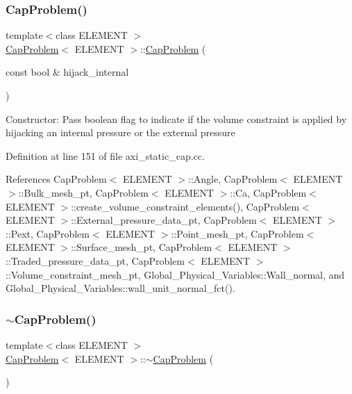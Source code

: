 \subsubsection{\texorpdfstring{Cap\+Problem()}{CapProblem()}}
{\footnotesize\ttfamily template$<$class E\+L\+E\+M\+E\+NT $>$ \\
\hyperlink{classCapProblem}{Cap\+Problem}$<$ E\+L\+E\+M\+E\+NT $>$\+::\hyperlink{classCapProblem}{Cap\+Problem} (\begin{DoxyParamCaption}\item[{const bool \&}]{hijack\+\_\+internal }\end{DoxyParamCaption})}

Constructor\+: Pass boolean flag to indicate if the volume constraint is applied by hijacking an internal pressure or the external pressure 

Definition at line 151 of file axi\+\_\+static\+\_\+cap.\+cc.



References Cap\+Problem$<$ E\+L\+E\+M\+E\+N\+T $>$\+::\+Angle, Cap\+Problem$<$ E\+L\+E\+M\+E\+N\+T $>$\+::\+Bulk\+\_\+mesh\+\_\+pt, Cap\+Problem$<$ E\+L\+E\+M\+E\+N\+T $>$\+::\+Ca, Cap\+Problem$<$ E\+L\+E\+M\+E\+N\+T $>$\+::create\+\_\+volume\+\_\+constraint\+\_\+elements(), Cap\+Problem$<$ E\+L\+E\+M\+E\+N\+T $>$\+::\+External\+\_\+pressure\+\_\+data\+\_\+pt, Cap\+Problem$<$ E\+L\+E\+M\+E\+N\+T $>$\+::\+Pext, Cap\+Problem$<$ E\+L\+E\+M\+E\+N\+T $>$\+::\+Point\+\_\+mesh\+\_\+pt, Cap\+Problem$<$ E\+L\+E\+M\+E\+N\+T $>$\+::\+Surface\+\_\+mesh\+\_\+pt, Cap\+Problem$<$ E\+L\+E\+M\+E\+N\+T $>$\+::\+Traded\+\_\+pressure\+\_\+data\+\_\+pt, Cap\+Problem$<$ E\+L\+E\+M\+E\+N\+T $>$\+::\+Volume\+\_\+constraint\+\_\+mesh\+\_\+pt, Global\+\_\+\+Physical\+\_\+\+Variables\+::\+Wall\+\_\+normal, and Global\+\_\+\+Physical\+\_\+\+Variables\+::wall\+\_\+unit\+\_\+normal\+\_\+fct().

\mbox{\label{classCapProblem_ad2b434212ecb33467359aef1071bc964}} 
\subsubsection{\texorpdfstring{$\sim$\+Cap\+Problem()}{~CapProblem()}}
{\footnotesize\ttfamily template$<$class E\+L\+E\+M\+E\+NT $>$ \\
\hyperlink{classCapProblem}{Cap\+Problem}$<$ E\+L\+E\+M\+E\+NT $>$\+::$\sim$\hyperlink{classCapProblem}{Cap\+Problem} (\begin{DoxyParamCaption}{ }\end{DoxyParamCaption})}


